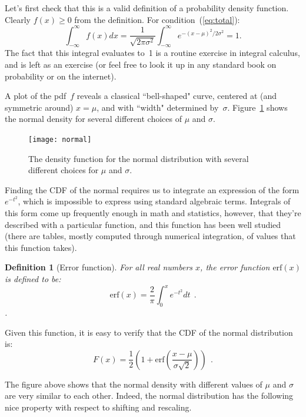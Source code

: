 \documentclass[11pt]{article}
\newcounter{thm}
\newtheorem{definition}{Definition}[thm]
\begin{document}
Let's first check that this is a valid definition of a probability density function. Clearly $f(x) \ge 0$ from
the definition. For condition~(\ref{eq:total}):
\begin{equation}\label{eq:totalnormal}
   \int_{-\infty}^\infty f(x)dx = \frac{1}{\sqrt{2\pi\sigma^2}} \int_{-\infty}^\infty e^{-(x-\mu)^2/2\sigma^2} =1.
\end{equation}
The fact that this integral evaluates to~1 is a routine exercise in integral calculus, and is left
as an exercise (or feel free to look it up in any standard book on probability or on the internet).


A plot of the pdf~$f$ reveals a classical ``bell-shaped" curve, centered at (and symmetric
around) $x=\mu$, and with ``width" determined by~$\sigma$. 
Figure~\ref{fig:normal} shows the normal density for several different choices of $\mu$ and $\sigma$.

\begin{figure}[h!]
\centering
\texttt{[image: normal]}
\caption{The density function for the normal distribution with several different choices for $\mu$ and $\sigma$.}
\label{fig:normal}
\end{figure}

Finding the CDF of the normal requires us to integrate an expression of the form $e^{-t^2}$, which is impossible to express
using standard algebraic terms. Integrals of this form come up frequently enough in math and statistics, however, that
they're described with a particular function, and this function has been well studied (there are tables, mostly computed through numerical integration, of values that this function takes).

\begin{definition}[Error function]
For all real numbers $x$, the error function $\mbox{erf}(x)$ is defined to be: $$\mbox{erf}(x) = \frac{2}{\pi} \int_0^x e^{-t^2} dt~~.$$.
\end{definition}

Given this function, it is easy to verify that the CDF of the normal distribution is: $$F(x) = \frac{1}{2} \left( 1 + \mbox{erf} \left( \frac{x-\mu}{\sigma \sqrt{2}} \right) \right)~~.$$


The figure above shows that the normal density with different values of $\mu$ and $\sigma$ are very similar to each other.
Indeed, the normal distribution has the following nice property with respect to shifting and rescaling.
\end{document}
